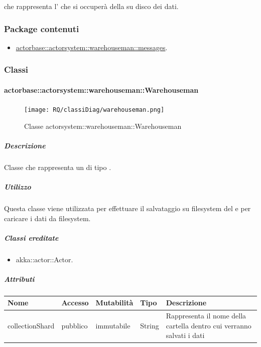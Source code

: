 \documentclass{scalatekids-article}
\begin{document}
 che rappresenta l' che si occuperà della
 su disco dei dati.

\subsubsection{Package contenuti}

\begin{itemize}

\item \hyperref[sec:actorbase::actorsystem::warehouseman::messages]{actorbase::actorsystem::warehouseman::messages}.

\end{itemize}

\subsubsection{Classi}

\paragraph{actorbase::actorsystem::warehouseman::Warehouseman}
\label{sec:actorbase::actorsystem::warehouseman::Warehouseman}

\begin{figure}[H]
   \begin{center}
     \texttt{[image: RQ/classiDiag/warehouseman.png]}
     \caption{Classe actorsystem::warehouseman::Warehouseman}
   \end{center}
 \end{figure}

\subparagraph{Descrizione}
Classe che rappresenta un  di tipo .

\subparagraph{Utilizzo}
Questa classe viene utilizzata per effettuare il salvataggio su filesystem del
 e per caricare i dati da filesystem.

\subparagraph{Classi ereditate}

\begin{itemize}

\item akka::actor::Actor.

\end{itemize}

\subparagraph{Attributi}
\begin{tabular}{| p{3cm} | p{1.5cm} | p{2cm} | p{2cm} | p{8.5cm} |}
  \hline
  Nome & Accesso & Mutabilità & Tipo & Descrizione\\
  \hline
  collectionShard & pubblico & immutabile & String & Rappresenta il nome della cartella dentro cui verranno salvati i dati \\
  \hline
\end{tabular}
\end{document}
